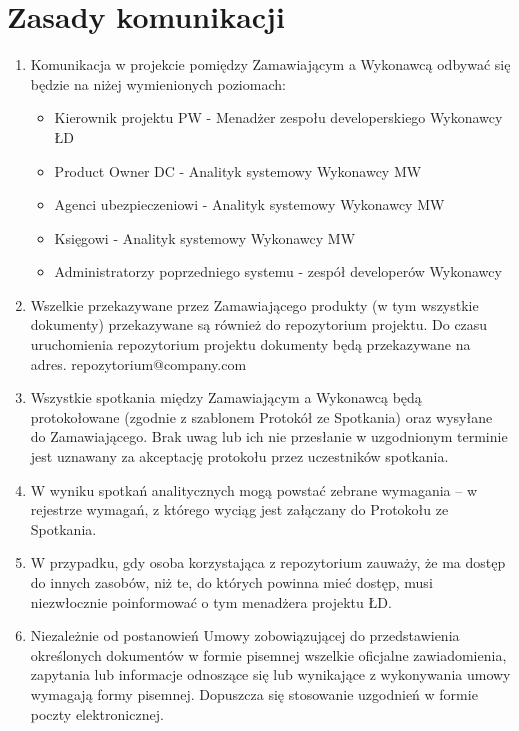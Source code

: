 \documentclass{article}
\begin{document}
\section{Zasady komunikacji}
\begin{enumerate}
	\item Komunikacja w projekcie pomiędzy Zamawiającym a Wykonawcą odbywać się będzie na niżej
	wymienionych poziomach:
	\begin{itemize}
		\item Kierownik projektu PW - Menadżer zespołu developerskiego Wykonawcy ŁD
		\item Product Owner DC  - Analityk systemowy Wykonawcy MW
		\item Agenci ubezpieczeniowi - Analityk systemowy Wykonawcy MW
		\item Księgowi - Analityk systemowy Wykonawcy MW
		\item Administratorzy poprzedniego systemu - zespół developerów Wykonawcy
	\end{itemize}
	\item Wszelkie przekazywane przez Zamawiającego produkty (w tym wszystkie dokumenty)
	przekazywane są również do repozytorium projektu. Do czasu uruchomienia repozytorium
	projektu dokumenty będą przekazywane na adres. repozytorium@company.com %
	\item Wszystkie spotkania między Zamawiającym a Wykonawcą będą protokołowane (zgodnie z szablonem Protokół ze Spotkania) %
	oraz wysyłane do Zamawiającego. Brak uwag lub ich nie przesłanie w uzgodnionym terminie jest uznawany za akceptację protokołu przez
	uczestników spotkania.
	\item W wyniku spotkań analitycznych mogą powstać zebrane wymagania – w rejestrze wymagań,
	z którego wyciąg jest załączany do Protokołu ze Spotkania.
	\item W przypadku, gdy osoba korzystająca z repozytorium zauważy, że ma dostęp do innych
	zasobów, niż te, do których powinna mieć dostęp, musi niezwłocznie poinformować o tym
	menadżera projektu ŁD.
	\item Niezależnie od postanowień Umowy zobowiązującej do przedstawienia określonych
	dokumentów w formie pisemnej wszelkie oficjalne zawiadomienia, zapytania lub
	informacje odnoszące się lub wynikające z wykonywania umowy wymagają formy pisemnej.
	Dopuszcza się stosowanie uzgodnień w formie poczty elektronicznej.
\end{enumerate}
\end{document}
